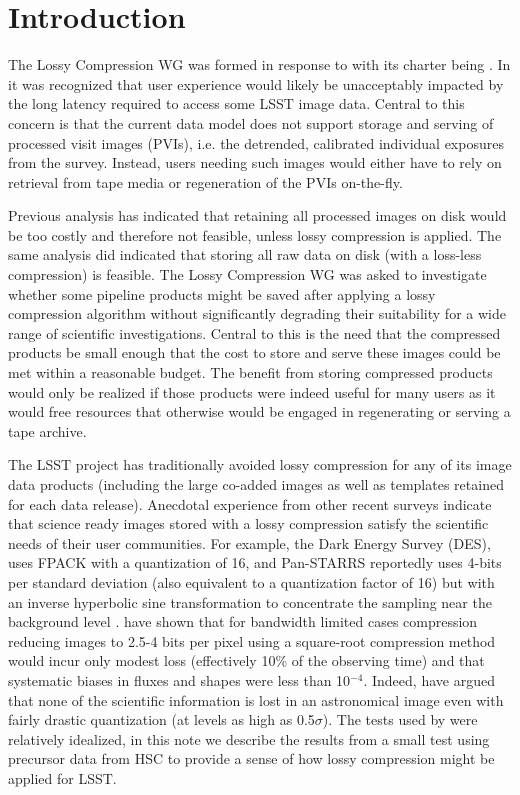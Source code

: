 
\section{Introduction}

The Lossy Compression WG was formed in response to  with its charter
being .  In  it was recognized that user 
experience would likely be unacceptably impacted by the long latency required to 
access some LSST image data.  Central to this concern is that the current data model 
does not support storage and serving of processed visit images (PVIs), i.e. the 
detrended, calibrated individual exposures from the survey.  Instead, users needing
such images would either have to rely on retrieval from tape media or regeneration
of the PVIs on-the-fly.

Previous analysis has indicated that retaining all processed images on disk would 
be too costly and therefore not feasible, unless lossy compression is applied. 
The same analysis did indicated that storing all raw data on disk (with a loss-less 
compression) is feasible.  The Lossy Compression WG was asked to investigate whether 
some pipeline products might be saved after applying a lossy compression algorithm 
without significantly degrading their suitability for a wide range of scientific 
investigations.  Central to this is the need that the compressed products be small 
enough that the cost to store and serve these images could be met within a reasonable 
budget.  The benefit from storing compressed products would only be realized if those 
products were indeed useful for many users as it would free resources that otherwise
would be engaged in regenerating or serving a tape archive.

The LSST project has traditionally avoided lossy compression for any of its image data products 
(including the large co-added images as well as templates retained for each data release). 
Anecdotal experience from other recent surveys indicate that science ready images stored
with a lossy compression satisfy the scientific needs of their user communities.  For example, 
the Dark Energy Survey (DES), uses FPACK \citep{PSW2009} with a quantization of 16, 
and Pan-STARRS reportedly uses 4-bits per standard deviation (also equivalent to a 
quantization factor of 16) but with an inverse hyperbolic sine transformation to concentrate 
the sampling near the background level \citep{Wetal2016}.  \citet{Betal2010} have shown that 
for bandwidth limited cases compression reducing images to 2.5-4 bits per pixel using a square-root
compression method would incur only modest loss (effectively 10\% of the observing time) and that 
systematic biases in fluxes and shapes were less than 10$^{-4}$.  Indeed, \citet{PWH2010} have 
argued that none of the scientific information is lost in an astronomical image even with 
fairly drastic quantization (at levels as high as 0.5$\sigma$).  The tests used by \citet{PWH2010} 
were relatively idealized, in this note we describe the results from a small test using 
precursor data from HSC to provide a sense of how lossy compression might be applied for LSST.


